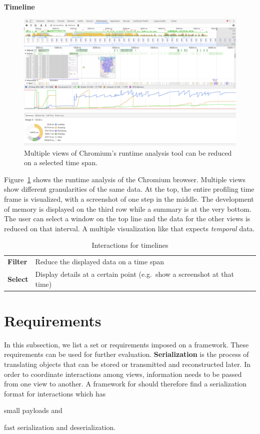 \textbf{Timeline}
\begin{figure}
  \centering
    \includegraphics[width=\textwidth]{figures/analysis/profiler}
  \caption{ Multiple views of Chromium's runtime analysis tool can be reduced on a selected time span. }
  \label{fig:analysis:timeline}
\end{figure}
Figure~\ref{fig:analysis:timeline} shows the runtime analysis of the Chromium browser.
Multiple views show different granularities of the same data.
At the top, the entire profiling time frame is visualized, with a screenshot of one step in the middle.
The development of memory is displayed on the third row while a summary is at the very bottom.
The user can select a window on the top line and the data for the other views is reduced on that interval.
A multiple visualization like that expects \emph{temporal} data.

\begin{table}
  \centering
  \caption{Interactions for timelines}%
  \label{fig:analysis:timeline:interactions}
  \begin{tabular}{ll}
    \bf Filter & Reduce the displayed data on a time span \\
    \bf Select & Display details at a certain point (e.g.\ show a screenshot at that time) \\
  \end{tabular}
\end{table}





\section{Requirements}\label{sec:analysis:requirements}
In this subsection, we list a set or requirements imposed on a \cmv{} framework.
These requirements can be used for further evaluation.
\textbf{Serialization} is the process of translating objects that can be stored or transmitted and reconstructed later.
In order to coordinate interactions among views, information needs to be passed from one view to another.
A framework for \cmvs{} should therefore find a serialization format for interactions which has
\begin{enumerate*}[label=(\arabic*)]
  \item
    small payloads and
  \item 
    fast serialization and deserialization.
\end{enumerate*}

